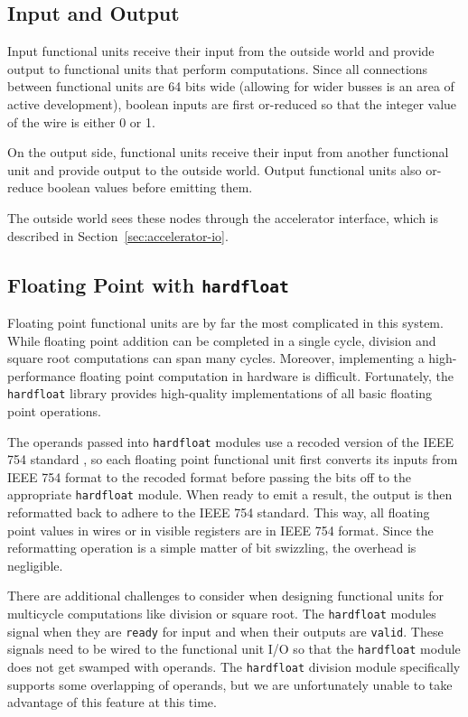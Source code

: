 \documentclass[sigconf, nonacm]{acmart}
\begin{document}
\subsection{Input and Output}

Input functional units receive their input from the outside world and provide output to functional units that perform computations.
Since all connections between functional units are 64 bits wide (allowing for wider busses is an area of active development), boolean inputs are first or-reduced so that the integer value of the wire is either 0 or 1.

On the output side, functional units receive their input from another functional unit and provide output to the outside world.
Output functional units also or-reduce boolean values before emitting them.

The outside world sees these nodes through the accelerator interface, which is described in Section~\ref{sec:accelerator-io}.

\subsection{Floating Point with \texttt{hardfloat}}

Floating point functional units are by far the most complicated in this system.
While floating point addition can be completed in a single cycle, division and square root computations can span many cycles.
Moreover, implementing a high-performance floating point computation in hardware is difficult.
Fortunately, the \texttt{hardfloat} library \cite{berkeley-hardfloat} provides high-quality implementations of all basic floating point operations.

The operands passed into \texttt{hardfloat} modules use a recoded version of the IEEE 754 standard \cite{ieee-fp-2019}, so each floating point functional unit first converts its inputs from IEEE 754 format to the recoded format before passing the bits off to the appropriate \texttt{hardfloat} module.
When ready to emit a result, the output is then reformatted back to adhere to the IEEE 754 standard.
This way, all floating point values in wires or in visible registers are in IEEE 754 format.
Since the reformatting operation is a simple matter of bit swizzling, the overhead is negligible.

There are additional challenges to consider when designing functional units for multicycle computations like division or square root.
The \texttt{hardfloat} modules signal when they are \texttt{ready} for input and when their outputs are \texttt{valid}.
These signals need to be wired to the functional unit I/O so that the \texttt{hardfloat} module does not get swamped with operands.
The \texttt{hardfloat} division module specifically supports some overlapping of operands, but we are unfortunately unable to take advantage of this feature at this time.
\end{document}
